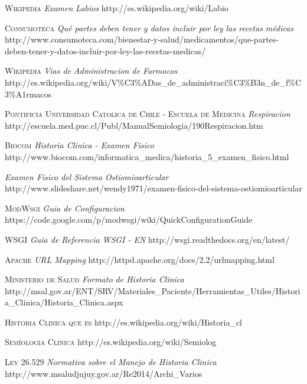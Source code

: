 \begin{thebibliography}{X}
     \textsc{Wikipedia} \textit{Examen Labios} 
        http://es.wikipedia.org/wiki/Labio

     \textsc{Consumoteca} \textit{Qué partes deben tener y datos incluir por ley las recetas médicas}
        http://www.consumoteca.com/bienestar-y-salud/medicamentos/que-partes-deben-tener-y-datos-incluir-por-ley-las-recetas-medicas/

     \textsc{Wikipedia} \textit{Vias de Administracion de Farmacos}
        http://es.wikipedia.org/wiki/V\%C3\%ADas\_de\_administraci\%C3\%B3n\_de\_f\%C3\%A1rmacos
    
     \textsc{Pontificia Universidad Catolica de Chile - Escuela de Medicina} \textit{Respiracion}
        http://escuela.med.puc.cl/Publ/ManualSemiologia/190Respiracion.htm

     \textsc{Biocom} \textit{Historia Clinica - Examen Fisico}
        http://www.biocom.com/informatica\_medica/historia\_5\_examen\_fisico.html

     \textit{Examen Fisico del Sistema Ostiomioarticular}
        http://www.slideshare.net/wendy1971/examen-fisico-del-sistema-ostiomioarticular
    
     \textsc{ModWsgi} \textit{Guia de Configuracion}
        https://code.google.com/p/modwsgi/wiki/QuickConfigurationGuide
 
     \textsc{WSGI} \textit{Guia de Referencia WSGI - EN} 
        http://wsgi.readthedocs.org/en/latest/
    
     \textsc{Apache} \textit{URL Mapping} 
        http://httpd.apache.org/docs/2.2/urlmapping.html

     \textsc{Ministerio de Salud } \textit{Formato de Historia Clinica}
        http://msal.gov.ar/ENT/SRV/Materiales\_Paciente/Herramientas\_Utiles/Historia\_Clinica/Historia\_Clinica.aspx
   
     \textsc{Historia Clinica que es} 
        http://es.wikipedia.org/wiki/Historia\_cl%

     \textsc{Sem\'{\i}ologia Clinica}
        http://es.wikipedia.org/wiki/Semiolog%

     \textsc{Ley 26.529} \textit{Normativa sobre el Manejo de Historia Clinica}
        http://www.msaludjujuy.gov.ar/Re2014/Archi\_Varios%
    
\end{thebibliography}
